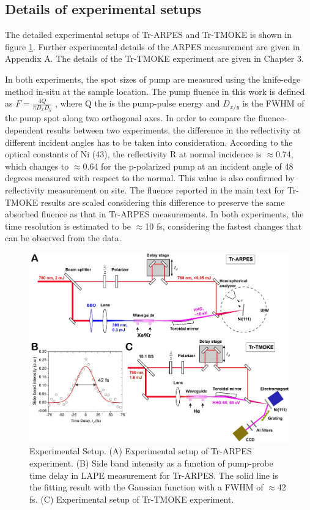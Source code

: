 \subsection{Details of experimental setups}
The detailed experimental setups of Tr-ARPES and Tr-TMOKE is shown in figure \ref{fig: NiSIfig1}. Further experimental details of the ARPES measurement are given in Appendix A. The details of the Tr-TMOKE experiment are given in Chapter 3.

In both experiments, the spot sizes of pump are measured using the knife-edge method in-situ at the sample location. The pump fluence in this work is defined as $F=\frac{4Q}{\pi D_x D_y}$ , where Q the is the pump-pulse energy and $D_{x/y}$ is the FWHM of the pump spot along two orthogonal axes. In order to compare the fluence-dependent results between two experiments, the difference in the reflectivity at different incident angles has to be taken into consideration. According to the optical constants of Ni (43), the reflectivity R at normal incidence is $\approx$0.74, which changes to $\approx$0.64 for the p-polarized pump at an incident angle of 48 degrees measured with respect to the normal. This value is also confirmed by reflectivity measurement on site. The fluence reported in the main text for Tr-TMOKE results are scaled considering this difference to preserve the same absorbed fluence as that in Tr-ARPES measurements. In both experiments, the time resolution is estimated to be $\approx$10 fs, considering the fastest changes that can be observed from the data.

\begin{figure}[htbp]
	\begin{center}
		\includegraphics[width=150mm]{figs/NiFigS1}
	\end{center}
	\caption{Experimental Setup. (A) Experimental setup of Tr-ARPES experiment. (B) Side band intensity as a function of pump-probe time delay in LAPE measurement for Tr-ARPES. The solid line is the fitting result with the Gaussian function with a FWHM of $\approx$42 fs. (C) Experimental setup of Tr-TMOKE experiment.}
	\label{fig: NiSIfig1}
\end{figure}

